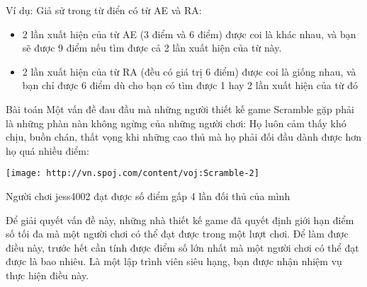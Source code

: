 Ví dụ: Giả sử trong từ điển có từ AE và RA:
\begin{itemize}
	\item 2 lần xuất hiện của từ AE (3 điểm và 6 điểm) được coi là khác nhau, và bạn sẽ được 9 điểm nếu tìm được cả 2 lần xuất hiện của từ này.
	\item 2 lần xuất hiện của từ RA (đều có giá trị 6 điểm) được coi là giống nhau, và bạn chỉ được 6 điểm dù cho bạn có tìm được 1 hay 2 lần xuất hiện của từ đó
\end{itemize}
Bài toán
Một vấn đề đau đầu mà những người thiết kế game Scramble gặp phải là những phàn nàn không ngừng của những người chơi: Họ luôn cảm thấy khó chịu, buồn chán, thất vọng khi những cao thủ mà họ phải đối đầu dành được hơn họ quá nhiều điểm:


\texttt{[image: http://vn.spoj.com/content/voj:Scramble-2]}

Người chơi jess4002 đạt được số điểm gấp 4 lần đối thủ của mình

Để giải quyết vấn đề này, những nhà thiết kế game đã quyết định giới hạn điểm số tối đa mà một người chơi có thể đạt được trong một lượt chơi. Để làm được điều này, trước hết cần tính được điểm số lớn nhất mà một người chơi có thể đạt được là bao nhiêu. Là một lập trình viên siêu hạng, bạn được nhận nhiệm vụ thực hiện điều này.

